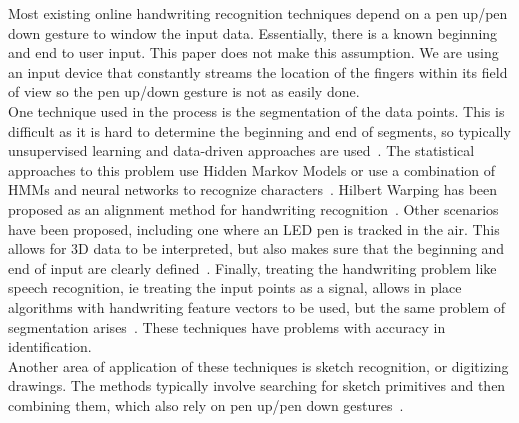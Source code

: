 Most existing online handwriting recognition techniques depend on a pen up/pen down gesture to window the input data. Essentially, there is a known beginning and end to user input. This paper does not make this assumption. We are using an input device that constantly streams the location of the fingers within its field of view so the pen up/down gesture is not as easily done. \\[1\baselineskip]
One technique used in the process is the segmentation of the data points. This is difficult as it is hard to determine the beginning and end of segments, so typically unsupervised learning and data-driven approaches are used~\cite{plamondon2000online}. The statistical approaches to this problem use Hidden Markov Models or use a combination of HMMs and neural networks to recognize characters~\cite{plotz2009markov}. Hilbert Warping has been proposed as an alignment method for handwriting recognition~\cite{ishida2010hilbert}. Other scenarios have been proposed, including one where an LED pen is tracked in the air. This allows for 3D data to be interpreted, but also makes sure that the beginning and end of input are clearly defined~\cite{asano2010visual}. Finally, treating the handwriting problem like speech recognition, ie treating the input points as a signal, allows in place algorithms with handwriting feature vectors to be used, but the same problem of segmentation arises~\cite{starner1994online}. These techniques have problems with accuracy in identification. \\[1\baselineskip]
Another area of application of these techniques is sketch recognition, or digitizing drawings. The methods typically involve searching for sketch primitives and then combining them, which also rely on pen up/pen down gestures~\cite{hammond2011recognizing}. 
